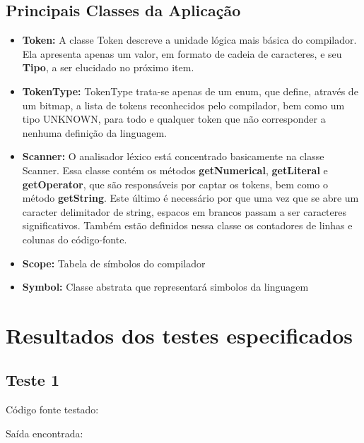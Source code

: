 \documentclass[11pt]{article}
\begin{document}
	\subsection{Principais Classes da Aplicação}
		
		
		\begin{itemize}
			
			\item \textbf{Token: }A classe Token descreve a unidade lógica mais básica do compilador. Ela apresenta apenas um valor, em formato de cadeia de caracteres, e seu \textbf{Tipo}, a ser elucidado no próximo item. 
			
			\item \textbf{TokenType: } TokenType trata-se apenas de um enum, que define, através de um bitmap, a lista de tokens reconhecidos pelo compilador, bem como um tipo UNKNOWN, para todo e qualquer token que não corresponder a nenhuma definição da linguagem.
			
			\item \textbf{Scanner: } O analisador léxico está concentrado basicamente na classe Scanner. Essa classe contém os métodos \textbf{getNumerical}, \textbf{getLiteral} e \textbf{getOperator}, que são responsáveis por captar os tokens, bem como o método \textbf{getString}. Este último é necessário por que uma vez que se abre um caracter delimitador de string, espacos em brancos passam a ser caracteres significativos. Também estão definidos nessa classe os contadores de linhas e colunas do código-fonte.
			
			\item \textbf{Scope: } Tabela de símbolos do compilador
			
			\item \textbf{Symbol: } Classe abstrata que representará simbolos da linguagem
		\end{itemize}
		

\newpage
\section{Resultados dos testes especificados}


	\subsection{Teste 1}
	
		Código fonte testado:
		
			
		Saída encontrada:
		
	
\end{document}
